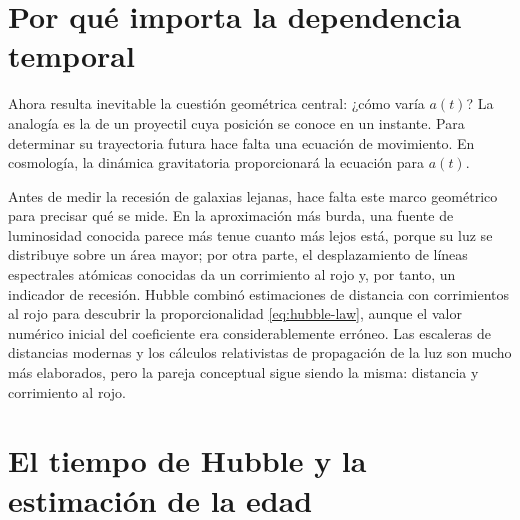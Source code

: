 \section{Por qué importa la dependencia temporal}

Ahora resulta inevitable la cuestión geométrica central: ¿cómo varía \(a(t)\)? La analogía es la de un proyectil cuya posición se conoce en un instante. Para determinar su trayectoria futura hace falta una ecuación de movimiento. En cosmología, la dinámica gravitatoria proporcionará la ecuación para \(a(t)\).

\begin{classroomqa}
\end{classroomqa}

Antes de medir la recesión de galaxias lejanas, hace falta este marco geométrico para precisar qué se mide. En la aproximación más burda, una fuente de luminosidad conocida parece más tenue cuanto más lejos está, porque su luz se distribuye sobre un área mayor; por otra parte, el desplazamiento de líneas espectrales atómicas conocidas da un corrimiento al rojo y, por tanto, un indicador de recesión. Hubble combinó estimaciones de distancia con corrimientos al rojo para descubrir la proporcionalidad \eqref{eq:hubble-law}, aunque el valor numérico inicial del coeficiente era considerablemente erróneo. Las escaleras de distancias modernas y los cálculos relativistas de propagación de la luz son mucho más elaborados, pero la pareja conceptual sigue siendo la misma: distancia y corrimiento al rojo.

\section{El tiempo de Hubble y la estimación de la edad}

